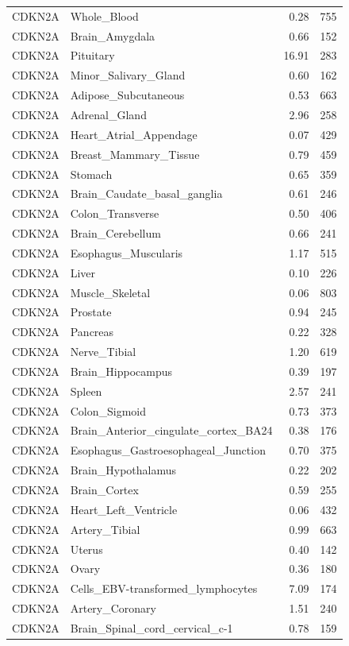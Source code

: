 \begin{footnotesize}
\begin{longtable}{llrr}
CDKN2A & Whole\_Blood & 0.28 & 755 \\
CDKN2A & Brain\_Amygdala & 0.66 & 152 \\
CDKN2A & Pituitary & 16.91 & 283 \\
CDKN2A & Minor\_Salivary\_Gland & 0.60 & 162 \\
CDKN2A & Adipose\_Subcutaneous & 0.53 & 663 \\
CDKN2A & Adrenal\_Gland & 2.96 & 258 \\
CDKN2A & Heart\_Atrial\_Appendage & 0.07 & 429 \\
CDKN2A & Breast\_Mammary\_Tissue & 0.79 & 459 \\
CDKN2A & Stomach & 0.65 & 359 \\
CDKN2A & Brain\_Caudate\_basal\_ganglia & 0.61 & 246 \\
CDKN2A & Colon\_Transverse & 0.50 & 406 \\
CDKN2A & Brain\_Cerebellum & 0.66 & 241 \\
CDKN2A & Esophagus\_Muscularis & 1.17 & 515 \\
CDKN2A & Liver & 0.10 & 226 \\
CDKN2A & Muscle\_Skeletal & 0.06 & 803 \\
CDKN2A & Prostate & 0.94 & 245 \\
CDKN2A & Pancreas & 0.22 & 328 \\
CDKN2A & Nerve\_Tibial & 1.20 & 619 \\
CDKN2A & Brain\_Hippocampus & 0.39 & 197 \\
CDKN2A & Spleen & 2.57 & 241 \\
CDKN2A & Colon\_Sigmoid & 0.73 & 373 \\
CDKN2A & Brain\_Anterior\_cingulate\_cortex\_BA24 & 0.38 & 176 \\
CDKN2A & Esophagus\_Gastroesophageal\_Junction & 0.70 & 375 \\
CDKN2A & Brain\_Hypothalamus & 0.22 & 202 \\
CDKN2A & Brain\_Cortex & 0.59 & 255 \\
CDKN2A & Heart\_Left\_Ventricle & 0.06 & 432 \\
CDKN2A & Artery\_Tibial & 0.99 & 663 \\
CDKN2A & Uterus & 0.40 & 142 \\
CDKN2A & Ovary & 0.36 & 180 \\
CDKN2A & Cells\_EBV-transformed\_lymphocytes & 7.09 & 174 \\
CDKN2A & Artery\_Coronary & 1.51 & 240 \\
CDKN2A & Brain\_Spinal\_cord\_cervical\_c-1 & 0.78 & 159 \\

\end{longtable}
\end{footnotesize}
